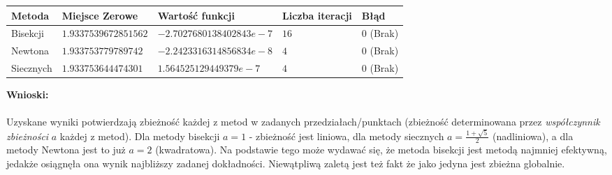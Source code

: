 \documentclass{article}
\begin{document}
\begin{center}
	\begin{tabular}{|p{3cm}|p{3.5cm}|p{4cm}|p{3cm}|p{}|} \hline
		\textbf{Metoda} & \textbf{Miejsce Zerowe} & \textbf{Wartość funkcji} & \textbf{Liczba iteracji} & \textbf{Błąd} \\
		\hline
		Bisekcji & $1.9337539672851562$ & $-2.7027680138402843e-7$ & $16$ & $0$ (Brak) \\
		\hline
		Newtona & $1.933753779789742$ & $-2.2423316314856834e-8$ & $4$ & $0$ (Brak) \\
		\hline
		Siecznych & $1.933753644474301$ & $1.564525129449379e-7$ & $4$ & $0$ (Brak) \\
		\hline
	\end{tabular}
\end{center}
\noindent \textbf{Wnioski: }\\\\
Uzyskane wyniki potwierdzają zbieżność każdej z metod w zadanych przedziałach/punktach (zbieżność determinowana przez \textit{współczynnik zbieżności} $a$ każdej z metod). Dla metody bisekcji $a = 1$ - zbieżność jest liniowa, dla metody siecznych $a=\frac{1+\sqrt{5}}{2}$ (nadliniowa), a dla metody Newtona jest to już $a=2$ (kwadratowa). Na podstawie tego może wydawać się, że metoda bisekcji jest metodą najmniej efektywną, jedakże osiągnęła ona wynik najbliższy zadanej dokładności. Niewątpliwą zaletą jest też fakt że jako jedyna jest zbieżna globalnie.
\end{document}
